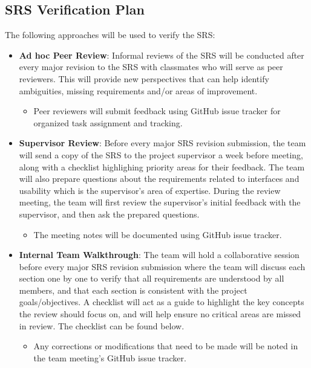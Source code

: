 \documentclass[12pt, titlepage]{article}
\begin{document}
\subsection{SRS Verification Plan}

The following approaches will be used to verify the SRS:

\begin{itemize}
  \item \textbf{Ad hoc Peer Review}: Informal reviews of the SRS will be conducted after every major revision 
  to the SRS with classmates who will serve as peer reviewers. This will provide new perspectives that can 
  help identify ambiguities, missing requirements and/or areas of improvement. 
  \begin{itemize}
    \item Peer reviewers will submit feedback using GitHub issue tracker for organized task assignment and tracking.
  \end{itemize}
  \item \textbf{Supervisor Review}: Before every major SRS revision submission, the team will 
  send a copy of the SRS to the project supervisor a week before meeting, along with a checklist highlighing 
  priority areas for their feedback. The team will also prepare questions about the requirements related to 
  interfaces and usability which is the supervisor's area of expertise. During the review meeting, the team will 
  first review the supervisor's initial feedback with the supervisor, and then ask the prepared questions.
  \begin{itemize}
    \item The meeting notes will be documented using GitHub issue tracker.
  \end{itemize}
  \item \textbf{Internal Team Walkthrough}: The team will hold a collaborative session 
  before every major SRS revision submission where the team will discuss each section one 
  by one to verify that all requirements are understood by all members, and that each section 
  is consistent with the project goals/objectives. A checklist will act as a guide to highlight the key concepts 
  the review should focus on, and will help ensure no critical areas are missed in review. The checklist can be found 
  below.
  \begin{itemize}
    \item Any corrections or modifications that need to be made will be noted in the team 
    meeting's GitHub issue tracker.
  \end{itemize}
\end{itemize}
\end{document}
